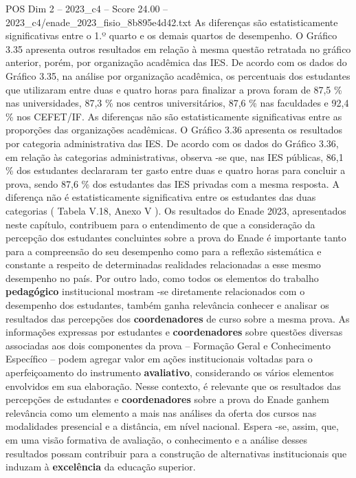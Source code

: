 \begin{textsample}{POS Dim 2 – 2023\_c4 – Score 24.00 – 2023\_c4/enade\_2023\_fisio\_8b895e4d42.txt}
As diferenças são estatisticamente significativas entre o 1.º quarto e os demais quartos de desempenho.
O Gráfico 3.35 apresenta outros resultados em relação à mesma questão retratada no gráfico anterior, porém, por organização acadêmica das IES.
De acordo com os dados do Gráfico 3.35, na análise por organização acadêmica, os percentuais dos estudantes que utilizaram entre duas e quatro horas para finalizar a prova foram de 87,5 \% nas universidades, 87,3 \% nos centros universitários, 87,6 \% nas faculdades e 92,4 \% nos CEFET/IF.
As diferenças não são estatisticamente significativas entre as proporções das organizações acadêmicas.
O Gráfico 3.36 apresenta os resultados por categoria administrativa das IES.
De acordo com os dados do Gráfico 3.36, em relação às categorias administrativas, observa -se que, nas IES públicas, 86,1 \% dos estudantes declararam ter gasto entre duas e quatro horas para concluir a prova, sendo 87,6 \% dos estudantes das IES privadas com a mesma resposta.
A diferença não é estatisticamente significativa entre os estudantes das duas categorias ( Tabela V.18, Anexo V ).
Os resultados do Enade 2023, apresentados neste capítulo, contribuem para o entendimento de que a consideração da percepção dos estudantes concluintes sobre a prova do Enade é importante tanto para a compreensão do seu desempenho como para a reflexão sistemática e constante a respeito de determinadas realidades relacionadas a esse mesmo desempenho no país.
Por outro lado, como todos os elementos do trabalho \textbf{pedagógico} institucional mostram -se diretamente relacionados com o desempenho dos estudantes, também ganha relevância conhecer e analisar os resultados das percepções dos \textbf{coordenadores} de curso sobre a mesma prova.
As informações expressas por estudantes e \textbf{coordenadores} sobre questões diversas associadas aos dois componentes da prova – Formação Geral e Conhecimento Específico – podem agregar valor em ações institucionais voltadas para o aperfeiçoamento do instrumento \textbf{avaliativo}, considerando os vários elementos envolvidos em sua elaboração.
Nesse contexto, é relevante que os resultados das percepções de estudantes e \textbf{coordenadores} sobre a prova do Enade ganhem relevância como um elemento a mais nas análises da oferta dos cursos nas modalidades presencial e a distância, em nível nacional.
Espera -se, assim, que, em uma visão formativa de avaliação, o conhecimento e a análise desses resultados possam contribuir para a construção de alternativas institucionais que induzam à \textbf{excelência} da educação superior.

\end{textsample}
